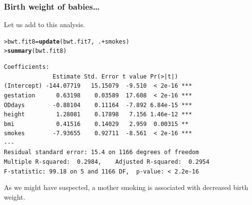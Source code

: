\documentclass{beamer}\usepackage[]{graphicx}\usepackage[]{xcolor}
\makeatletter
\newcommand{\hlopt}[1]{\textcolor[rgb]{0,0,0}{#1}}%
\newcommand{\hlstd}[1]{\textcolor[rgb]{0.345,0.345,0.345}{#1}}%
\newcommand{\hlkwb}[1]{\textcolor[rgb]{0.69,0.353,0.396}{#1}}%
\newcommand{\hlkwd}[1]{\textcolor[rgb]{0.737,0.353,0.396}{\textbf{#1}}}%
\newenvironment{kframe}{%
 \def\at@end@of@kframe{}%
 \ifinner\ifhmode%
  \def\at@end@of@kframe{\end{minipage}}%
  \begin{minipage}{\columnwidth}%
 \fi\fi%
 \def\FrameCommand##1{\hskip\@totalleftmargin \hskip-\fboxsep
 \colorbox{shadecolor}{##1}\hskip-\fboxsep
     \hskip-\linewidth \hskip-\@totalleftmargin \hskip\columnwidth}%
 \MakeFramed {\advance\hsize-\width
   \@totalleftmargin\z@ \linewidth\hsize
   \@setminipage}}%
 {\par\unskip\endMakeFramed%
 \at@end@of@kframe}
\newenvironment{knitrout}{}{} %
\makeatother
\begin{document}
\begin{frame}[fragile]
\frametitle{Birth weight of babies\ldots}
Let us add  to this analysis.
\begin{knitrout}\scriptsize
{}\color{fgcolor}\begin{kframe}
\begin{alltt}
\hlstd{> }\hlstd{bwt.fit8}\hlkwb{=}\hlkwd{update}\hlstd{(bwt.fit7,}\hlopt{~}\hlstd{.} \hlopt{+} \hlstd{smokes)}
\hlstd{> }\hlkwd{summary}\hlstd{(bwt.fit8)}
\end{alltt}
\end{kframe}
\end{knitrout}

\begin{knitrout}\scriptsize
{}\color{fgcolor}\begin{kframe}
\begin{verbatim}
Coefficients:
              Estimate Std. Error t value Pr(>|t|)    
(Intercept) -144.07719   15.15079  -9.510  < 2e-16 ***
gestation      0.63198    0.03589  17.608  < 2e-16 ***
ODdays        -0.88104    0.11164  -7.892 6.84e-15 ***
height         1.28081    0.17898   7.156 1.46e-12 ***
bmi            0.41516    0.14029   2.959  0.00315 ** 
smokes        -7.93655    0.92711  -8.561  < 2e-16 ***
---
Residual standard error: 15.4 on 1166 degrees of freedom
Multiple R-squared:  0.2984,	Adjusted R-squared:  0.2954 
F-statistic: 99.18 on 5 and 1166 DF,  p-value: < 2.2e-16
\end{verbatim}
\end{kframe}
\end{knitrout}

As we might have suspected, a mother smoking is associated with decreased birth weight.
\end{frame}
\end{document}
